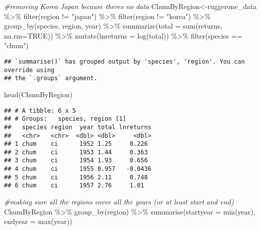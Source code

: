 \documentclass[
]{article}
\newenvironment{Shaded}{\begin{snugshade}}{\end{snugshade}}
\newcommand{\AttributeTok}[1]{\textcolor[rgb]{0.77,0.63,0.00}{#1}}
\newcommand{\CommentTok}[1]{\textcolor[rgb]{0.56,0.35,0.01}{\textit{#1}}}
\newcommand{\ConstantTok}[1]{\textcolor[rgb]{0.00,0.00,0.00}{#1}}
\newcommand{\FunctionTok}[1]{\textcolor[rgb]{0.00,0.00,0.00}{#1}}
\newcommand{\NormalTok}[1]{#1}
\newcommand{\OtherTok}[1]{\textcolor[rgb]{0.56,0.35,0.01}{#1}}
\newcommand{\SpecialCharTok}[1]{\textcolor[rgb]{0.00,0.00,0.00}{#1}}
\newcommand{\StringTok}[1]{\textcolor[rgb]{0.31,0.60,0.02}{#1}}
\begin{document}
\begin{Shaded}
\begin{Highlighting}[]
\CommentTok{\#removing Korea Japan because there\textquotesingle{}s no data}
\NormalTok{ChumByRegion}\OtherTok{\textless{}{-}}\NormalTok{ruggerone\_data }\SpecialCharTok{\%\textgreater{}\%}
  \FunctionTok{filter}\NormalTok{(region }\SpecialCharTok{!=} \StringTok{"japan"}\NormalTok{) }\SpecialCharTok{\%\textgreater{}\%}
  \FunctionTok{filter}\NormalTok{(region }\SpecialCharTok{!=} \StringTok{"korea"}\NormalTok{) }\SpecialCharTok{\%\textgreater{}\%}
  \FunctionTok{group\_by}\NormalTok{(species, region, year) }\SpecialCharTok{\%\textgreater{}\%}
  \FunctionTok{summarize}\NormalTok{(}\AttributeTok{total =} \FunctionTok{sum}\NormalTok{(returns, }\AttributeTok{na.rm=}\ConstantTok{TRUE}\NormalTok{)) }\SpecialCharTok{\%\textgreater{}\%} 
  \FunctionTok{mutate}\NormalTok{(}\AttributeTok{lnreturns =} \FunctionTok{log}\NormalTok{(total)) }\SpecialCharTok{\%\textgreater{}\%}
  \FunctionTok{filter}\NormalTok{(species }\SpecialCharTok{==} \StringTok{"chum"}\NormalTok{)}
\end{Highlighting}
\end{Shaded}

\begin{verbatim}
## `summarise()` has grouped output by 'species', 'region'. You can override using
## the `.groups` argument.
\end{verbatim}

\begin{Shaded}
\begin{Highlighting}[]
\FunctionTok{head}\NormalTok{(ChumByRegion)}
\end{Highlighting}
\end{Shaded}

\begin{verbatim}
## # A tibble: 6 x 5
## # Groups:   species, region [1]
##   species region  year total lnreturns
##   <chr>   <chr>  <dbl> <dbl>     <dbl>
## 1 chum    ci      1952 1.25     0.226 
## 2 chum    ci      1953 1.44     0.363 
## 3 chum    ci      1954 1.93     0.656 
## 4 chum    ci      1955 0.957   -0.0436
## 5 chum    ci      1956 2.11     0.748 
## 6 chum    ci      1957 2.76     1.01
\end{verbatim}

\begin{Shaded}
\begin{Highlighting}[]
\CommentTok{\#making sure all the regions cover all the years (or at least start and end)}
\NormalTok{ChumByRegion }\SpecialCharTok{\%\textgreater{}\%} \FunctionTok{group\_by}\NormalTok{(region) }\SpecialCharTok{\%\textgreater{}\%} \FunctionTok{summarise}\NormalTok{(}\AttributeTok{startyear =} \FunctionTok{min}\NormalTok{(year), }\AttributeTok{endyear =} \FunctionTok{max}\NormalTok{(year))}
\end{Highlighting}
\end{Shaded}
\end{document}
